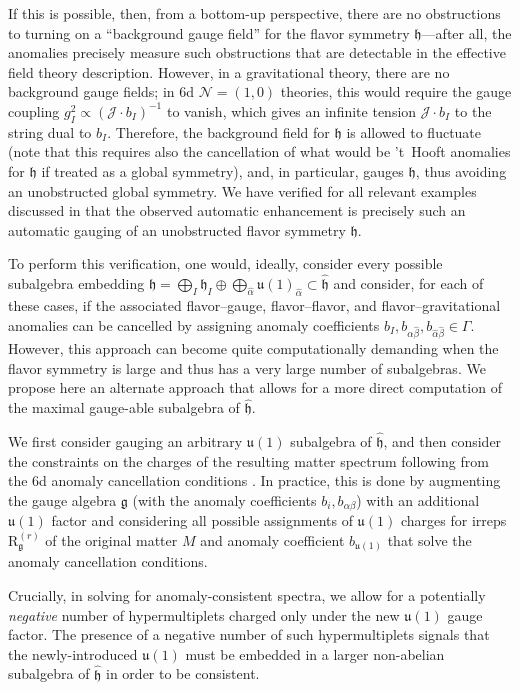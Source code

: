 \documentclass[11pt, a4paper]{article}
\newcommand*{\cJ}{\ensuremath{\mathcal{J}}}
\newcommand*{\cN}{\ensuremath{\mathcal{N}}}
\newcommand*{\fkg}{\ensuremath{\mathfrak{g}}}
\newcommand*{\fkh}{\ensuremath{\mathfrak{h}}}
\newcommand*{\fku}{\ensuremath{\mathfrak{u}}}
\newcommand*{\irrep}[2]{\ensuremath{\bm{\mathrm{R}}_{#1}^{(#2)}}}
\begin{document}
If this is possible, then, from a bottom-up perspective, there are no obstructions to turning on a ``background gauge field'' for the flavor symmetry $\fkh$---after all, the anomalies precisely measure such obstructions that are detectable in the effective field theory description.
However, in a gravitational theory, there are no background gauge fields; in 6d $\cN=(1,0)$ theories, this would require the gauge coupling $g_I^2 \propto (\cJ \cdot b_I)^{-1}$ to vanish, which gives an infinite tension $\cJ \cdot b_I$ to the string dual to $b_I$.
Therefore, the background field for $\fkh$ is allowed to fluctuate (note that this requires also the cancellation of what would be 't~Hooft anomalies for $\fkh$ if treated as a global symmetry), and, in particular, gauges $\fkh$, thus avoiding an unobstructed global symmetry.
We have verified for all relevant examples discussed in \cite{Raghuram:2020vxm} that the observed automatic enhancement is precisely such an automatic gauging of an unobstructed flavor symmetry $\fkh$.


To perform this verification, one would, ideally, consider every possible subalgebra embedding $\fkh = \bigoplus_I \fkh_I \oplus \bigoplus_{\hat{\alpha}} \fku(1)_{\hat{\alpha}} \subset \hat{\fkh}$ and consider, for each of these cases, if the associated flavor--gauge, flavor--flavor, and flavor--gravitational anomalies can be cancelled by assigning anomaly coefficients $b_I, b_{\alpha \hat{\beta}}, b_{\hat{\alpha} \hat{\beta}} \in \Gamma$.
However, this approach can become quite computationally demanding when the flavor symmetry is large and thus has a very large number of subalgebras. We propose here an alternate approach that allows for a more direct computation of the maximal gauge-able subalgebra of $\hat{\fkh}$.

We first consider gauging an arbitrary $\fku(1)$ subalgebra of $\hat{\fkh}$, and then consider the constraints on the charges of the resulting matter spectrum following from the 6d anomaly cancellation conditions .
In practice, this is done by augmenting the gauge algebra $\fkg$ (with the anomaly coefficients $b_i, b_{\alpha \beta}$) with an additional $\fku(1)$ factor and considering all possible assignments of $\fku(1)$ charges for irreps $\irrep{\fkg}{r}$ of the original matter $M$ and anomaly coefficient $b_{\fku(1)}$ that solve the anomaly cancellation conditions.


Crucially, in solving for anomaly-consistent spectra, we allow for a potentially \emph{negative} number of hypermultiplets charged only under the new $\fku(1)$ gauge factor.
The presence of a negative number of such hypermultiplets signals that the newly-introduced $\fku(1)$ must be embedded in a larger non-abelian subalgebra of $\hat{\fkh}$ in order to be consistent.
\end{document}
